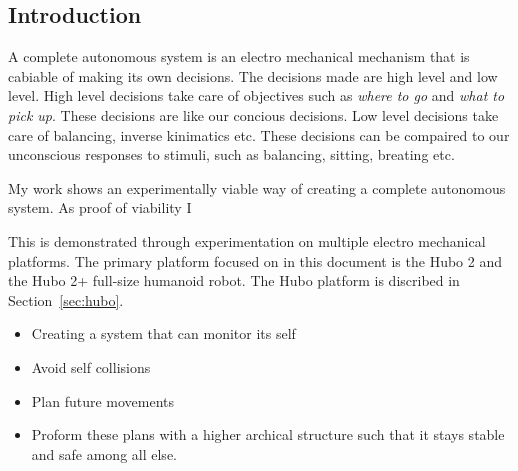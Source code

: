 \subsection{Introduction}

A complete autonomous system is an electro mechanical mechanism that is cabiable of making its own decisions.
The decisions made are high level and low level.
High level decisions take care of objectives such as \textit{where to go} and \textit{what to pick up}. 
These decisions are like our concious decisions.
Low level decisions take care of balancing, inverse kinimatics etc.
These decisions can be compaired to our unconscious responses to stimuli, such as balancing, sitting, breating etc.

My work shows an experimentally viable way of creating a complete autonomous system.  
As proof of viability I 


This is demonstrated through experimentation on multiple electro mechanical platforms.
The primary platform focused on in this document is the Hubo 2 and the Hubo 2+ full-size humanoid robot.
The Hubo platform is discribed in Section~\ref{sec:hubo}.




\begin{itemize}
\item Creating a system that can monitor its self
\item Avoid self collisions
\item Plan future movements
\item Proform these plans with a higher archical structure such that it stays stable and safe among all else.
\end{itemize}
